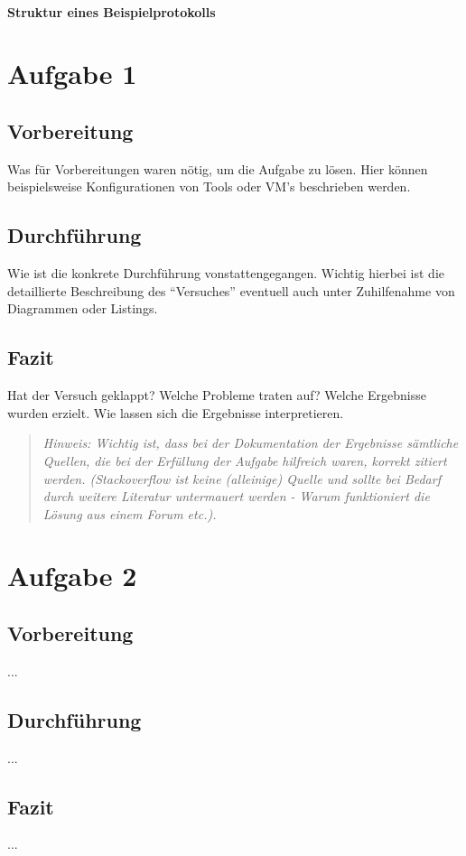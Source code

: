 
\newpage

\paragraph{\LARGE Struktur eines Beispielprotokolls}

\section{Aufgabe 1}
	\subsection{Vorbereitung}
	Was für Vorbereitungen waren nötig, um die Aufgabe zu lösen. Hier können beispielsweise Konfigurationen von Tools oder VM's beschrieben werden.
	\subsection{Durchführung}
	Wie ist die konkrete Durchführung vonstattengegangen. Wichtig hierbei ist die detaillierte Beschreibung des ``Versuches'' eventuell auch unter Zuhilfenahme von Diagrammen oder Listings.
	\subsection{Fazit}
	Hat der Versuch geklappt? Welche Probleme traten auf? Welche Ergebnisse wurden erzielt. Wie lassen sich die Ergebnisse interpretieren.
	
\begin{quote}
\textit{Hinweis: Wichtig ist, dass bei der Dokumentation der Ergebnisse sämtliche Quellen, die bei der Erfüllung der Aufgabe hilfreich waren, korrekt zitiert werden. (Stackoverflow ist keine (alleinige) Quelle und sollte bei Bedarf durch weitere Literatur untermauert werden - Warum funktioniert die Lösung aus einem Forum etc.).}
\end{quote}
\section{Aufgabe 2}
	\subsection{Vorbereitung}
	...
	\subsection{Durchführung}
	...
	\subsection{Fazit}
	...
\newpage
